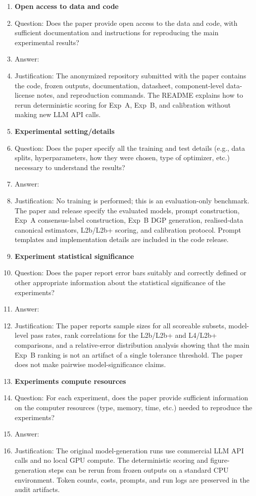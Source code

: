\begin{enumerate}
\item {\bf Open access to data and code}
    \item[] Question: Does the paper provide open access to the data and code, with sufficient documentation and instructions for reproducing the main experimental results?
    \item[] Answer: \answerYes{}
    \item[] Justification: The anonymized repository submitted with the paper contains the code, frozen outputs, documentation, datasheet, component-level data-license notes, and reproduction commands. The README explains how to rerun deterministic scoring for Exp~A, Exp~B, and calibration without making new LLM API calls.

\item {\bf Experimental setting/details}
    \item[] Question: Does the paper specify all the training and test details (e.g., data splits, hyperparameters, how they were chosen, type of optimizer, etc.) necessary to understand the results?
    \item[] Answer: \answerYes{}
\item[] Justification: No training is performed; this is an evaluation-only benchmark. The paper and release specify the evaluated models, prompt construction, Exp~A consensus-label construction, Exp~B DGP generation, realised-data canonical estimators, L2b/L2b+ scoring, and calibration protocol. Prompt templates and implementation details are included in the code release.

\item {\bf Experiment statistical significance}
    \item[] Question: Does the paper report error bars suitably and correctly defined or other appropriate information about the statistical significance of the experiments?
    \item[] Answer: \answerYes{}
    \item[] Justification: The paper reports sample sizes for all scoreable subsets, model-level pass rates, rank correlations for the L2b/L2b+ and L4/L2b+ comparisons, and a relative-error distribution analysis showing that the main Exp~B ranking is not an artifact of a single tolerance threshold. The paper does not make pairwise model-significance claims.

\item {\bf Experiments compute resources}
    \item[] Question: For each experiment, does the paper provide sufficient information on the computer resources (type, memory, time, etc.) needed to reproduce the experiments?
    \item[] Answer: \answerYes{}
\item[] Justification: The original model-generation runs use commercial LLM API calls and no local GPU compute. The deterministic scoring and figure-generation steps can be rerun from frozen outputs on a standard CPU environment. Token counts, costs, prompts, and run logs are preserved in the audit artifacts.


\end{enumerate}
